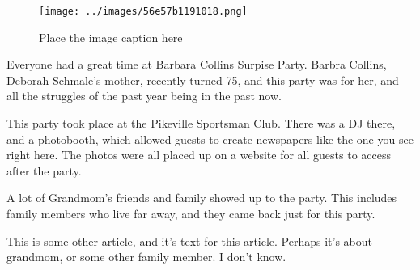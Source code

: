 \documentclass[letterpaper]{article}
\date{\today}
\begin{document}
\maketitle

\begin{figure}[h]
    \centering
    \texttt{[image: ../images/56e57b1191018.png]}
    \caption{Place the image caption here}
\end{figure}

\begin{multicols}{3}
    Everyone had a great time at Barbara Collins Surpise Party. Barbra
    Collins, Deborah Schmale's mother, recently turned 75, and this party
    was for her, and all the struggles of the past year being in the past
    now.
    
    This party
    took place at the Pikeville Sportsman Club. There was a DJ there, and a
    photobooth, which allowed guests to create newspapers like the one you
    see right here. The photos were all placed up on a website for all
    guests to access after the party.

    A lot of Grandmom's friends and family showed up to the party. This
    includes family members who live far away, and they came back just for
    this party.

    \closearticle

    This is some other article, and it's text for this article. Perhaps it's
    about grandmom, or some other family member. I don't know.
    
    \closearticle

\end{multicols}
\end{document}
